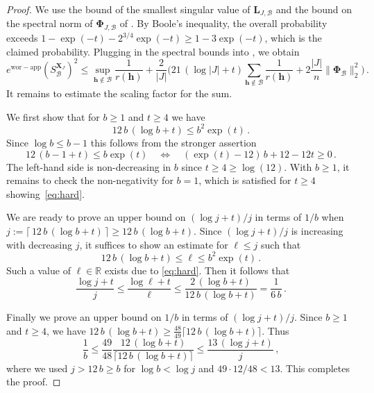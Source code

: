 \documentclass[a4paper]{amsart}
\newcommand{\ewc}{e^{\mathrm{wor-app}}}
\begin{document}
\begin{proof} We use the bound of the smallest singular value of $\bm L_{J,\mathcal B}$ and the bound on the spectral norm of $\bm\Phi_{J,\mathcal B}$ of .
    By Boole's inequality, the overall probability exceeds $1-\exp(-t)-2^{3/4}\exp(-t) \ge 1-3\exp(-t)$, which is the claimed probability.
    Plugging in the spectral bounds into , we obtain
    \begin{equation*}
        \ewc(S_{\mathcal B}^{\bm X_J})^2
        \le \sup_{\bm h\notin\mathcal B} \frac{1}{r(\bm h)}
        + 
        \frac{2}{|J|} \Big( 21 \,(\log|J|+t) \sum_{\bm h\notin\mathcal B} \frac{1}{r(\bm h)} + 2\frac{|J|}{n} \|\bm\Phi_{\mathcal B}\|_{2}^2\Big) \,.
    \end{equation*}
    It remains to estimate the scaling factor for the sum.

    We first show that for $b\ge 1$ and $t\ge 4$ we have
    \begin{equation}\label{eq:hard}
        12\,b\,(\log b+t)
        \le b^2\exp(t) \,.
    \end{equation}
    Since $\log b \le b-1$ this follows from the stronger assertion
    \begin{equation*}
        12\,(b-1+t)
        \le b\exp(t)
        \quad\Leftrightarrow\quad
        (\exp(t)-12)\,b +12-12t
        \ge 0 \,.
    \end{equation*}
    The left-hand side is non-decreasing in $b$ since $t\ge 4 \ge \log(12)$.
    With $b\ge 1$, it remains to check the non-negativity for $b=1$, which is satisfied for $t\ge 4$ showing~\eqref{eq:hard}.

    We are ready to prove an upper bound on $(\log j+t)/j$ in terms of $1/b$ when $j := \lceil\,12\,b\,(\log b+t)\,\rceil \ge 12\,b\,(\log b+t)$.
    Since $(\log j+t)/j$ is increasing with decreasing $j$, it suffices to show an estimate for $\ell\le j$ such that
    \begin{equation*}
        12\,b\,(\log b+t)
        \le \ell
        \le b^2\exp(t) \,.
    \end{equation*}
    Such a value of $\ell\in\mathds R$ exists due to \eqref{eq:hard}.
    Then it follows that
    \begin{equation*}
        \frac{\log j+t}{j}
        \le \frac{\log\ell+t}{\ell}
        \le \frac{2 \, (\log b + t)}{12 \, b \, (\log b + t)}
        = \frac{1}{6\,b} \,.
    \end{equation*}
    
    Finally we prove an upper bound on $1/b$ in terms of $(\log j+t)/j$.
    Since $b\ge 1$ and $t\ge 4$, we have $12 \, b \, (\log b+t) \ge \frac{48}{49} \lceil 12 \, b \, (\log b+t)\rceil$.
    Thus
    \begin{equation*}
        \frac{1}{b}
        \le \frac{49}{48} \frac{12 \, (\log b+t)}{\lceil 12 \, b \, (\log b+t)\rceil}
        \le \frac{13 \, (\log j+t)}{j} \,,
    \end{equation*}
    where we used $j > 12\,b \ge b$ for $\log b < \log j$ and $49\cdot 12/48 <13$.
    This completes the proof.
\end{proof} 
\end{document}
